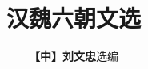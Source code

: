 \documentclass[a4paper, 12pt, openright]{ctexbook}
\begin{document}
\frontmatter

\title{\Huge \textbf{汉魏六朝文选}}
\author{\textbf{【中】刘文忠}\quad 选编}
\date{}

\maketitle



\tableofcontents

\mainmatter
\end{document}

